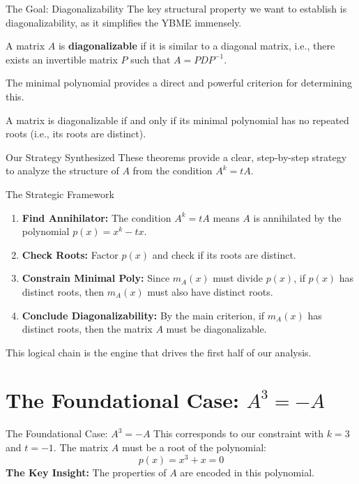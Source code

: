 \documentclass{beamer}
\begin{document}
\begin{frame}{The Goal: Diagonalizability}
  The key structural property we want to establish is diagonalizability, as it simplifies the YBME immensely.
  \begin{definition}
    A matrix $A$ is \textbf{diagonalizable} if it is similar to a diagonal matrix, i.e., there exists an invertible matrix $P$ such that $A = PDP^{-1}$.
  \end{definition}
  \vfill
  The minimal polynomial provides a direct and powerful criterion for determining this.
  \begin{theorem}
    A matrix is diagonalizable if and only if its minimal polynomial has no repeated roots (i.e., its roots are distinct).
  \end{theorem}
\end{frame}

\begin{frame}{Our Strategy Synthesized}
  These theorems provide a clear, step-by-step strategy to analyze the structure of $A$ from the condition $A^k=tA$.
  \begin{alertblock}{The Strategic Framework}
    \begin{enumerate}
        \item \textbf{Find Annihilator:} The condition $A^k=tA$ means $A$ is annihilated by the polynomial $p(x) = x^k - tx$.
        \pause
        \item \textbf{Check Roots:} Factor $p(x)$ and check if its roots are distinct.
        \pause
        \item \textbf{Constrain Minimal Poly:} Since $m_A(x)$ must divide $p(x)$, if $p(x)$ has distinct roots, then $m_A(x)$ must also have distinct roots.
        \pause
        \item \textbf{Conclude Diagonalizability:} By the main criterion, if $m_A(x)$ has distinct roots, then the matrix $A$ must be diagonalizable.
    \end{enumerate}
  \end{alertblock}
  This logical chain is the engine that drives the first half of our analysis.
\end{frame}

\section{The Foundational Case: $A^3 = -A$}

\begin{frame}{The Foundational Case: $A^3 = -A$}
  This corresponds to our constraint with $k=3$ and $t=-1$.
  \vfill
  The matrix $A$ must be a root of the polynomial:
  \[ p(x) = x^3 + x = 0 \]
  \vfill
  \textbf{The Key Insight:} The properties of $A$ are encoded in this polynomial.
\end{frame}
\end{document}
